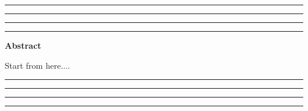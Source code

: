 \thispagestyle{empty}
\hrule\hrule\hrule\hrule %
\begin{center}
    \textbf{\large Abstract}
    \\
\end{center}

Start from here....


\vfill
\hrule\hrule\hrule\hrule
\clearpage
